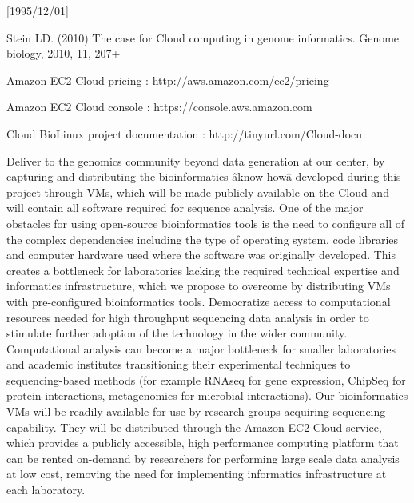 \NeedsTeXFormat{LaTeX2e}[1995/12/01] \documentclass[10pt]{bmc_article}
\newenvironment{bmcformat}{\begin{raggedright}\baselineskip20pt\sloppy\setboolean{publ}{false}}{\end{raggedright}\baselineskip20pt\sloppy}
\begin{document}
\begin{bmcformat}
Stein LD. (2010) The case for Cloud computing in genome informatics. Genome biology, 2010, 11, 207+ 

Amazon EC2 Cloud pricing : http://aws.amazon.com/ec2/pricing  

Amazon EC2 Cloud console : https://console.aws.amazon.com 

Cloud BioLinux project documentation : http://tinyurl.com/Cloud-docu

Deliver to the genomics community beyond data generation at our center, by capturing and distributing the
bioinformatics âknow-howâ developed during this project through VMs, which will be made publicly available on
the Cloud and will contain all software required for sequence analysis. One of the major obstacles for using
open-source bioinformatics tools is the need to configure all of the complex dependencies including the type
of operating system, code libraries and computer hardware used where the software was originally developed.
This creates a bottleneck for laboratories lacking the required technical expertise and informatics
infrastructure, which we propose to overcome by distributing VMs with pre-configured bioinformatics tools.
Democratize access to computational resources needed for high throughput sequencing data analysis in order to
stimulate further adoption of the technology in the wider community. Computational analysis can become a major
bottleneck for smaller laboratories and academic institutes transitioning their experimental techniques to
sequencing-based methods (for example RNAseq for gene expression, ChipSeq for protein interactions,
metagenomics for microbial interactions). Our bioinformatics VMs will be readily available for use by research
groups acquiring sequencing capability. They will be distributed through the Amazon EC2 Cloud service, which
provides a publicly accessible, high performance computing platform that can be rented on-demand by
researchers for performing large scale data analysis at low cost, removing the need for implementing
informatics infrastructure at each laboratory.  


\end{bmcformat}
\end{document}
